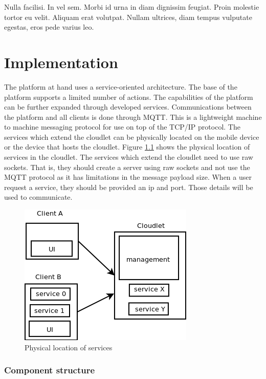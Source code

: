 \begin{savequote}[75mm] 
Nulla facilisi. In vel sem. Morbi id urna in diam dignissim feugiat. Proin molestie tortor eu velit. Aliquam erat volutpat. Nullam ultrices, diam tempus vulputate egestas, eros pede varius leo.
\end{savequote}

\chapter{Implementation}
\label{chapterfive}


The platform at hand uses a service-oriented architecture. The base of the platform supports a limited number of actions. The capabilities of the platform can be further expanded through developed services. Communications between the platform and all clients is done through MQTT. This is a lightweight machine to machine messaging protocol for use on top of the TCP/IP protocol. The services which extend the cloudlet can be physically located on the mobile device or the device that hosts the cloudlet. Figure \ref{fig:protocol} shows the physical location of services in the cloudlet. The services which extend the cloudlet need to use raw sockets. That is, they should create a server using raw sockets and not use the MQTT protocol as it has limitations in the message payload size. When a user request a service, they should be provided an ip and port. Those details will be used to communicate.


\begin{figure}
\centering
\includegraphics[scale=0.5]{figures/protocol}
\caption{Physical location of services}
\label{fig:protocol}
\end{figure}

\subsection{Component structure}

